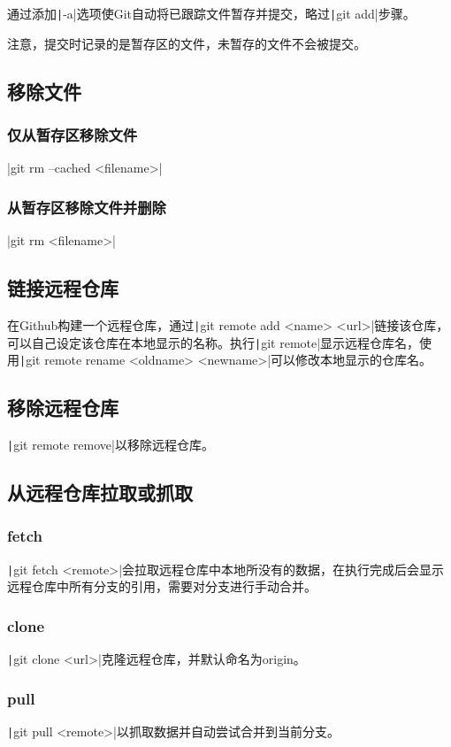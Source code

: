 \documentclass[fontset=ubuntu]{ctexart}
\begin{document}
通过添加\texttt|-a|选项使Git自动将已跟踪文件暂存并提交，略过\texttt|git add|步骤。

注意，提交时记录的是暂存区的文件，未暂存的文件不会被提交。

\subsection{移除文件}
\subsubsection{仅从暂存区移除文件}
|git rm --cached <filename>|

\subsubsection{从暂存区移除文件并删除}
|git rm <filename>|

\subsection{链接远程仓库}
在Github构建一个远程仓库，通过\texttt|git remote add <name> <url>|链接该仓库，可以自己设定该仓库在本地显示的名称。执行\texttt|git remote|显示远程仓库名，使用\texttt|git remote rename <oldname> <newname>|可以修改本地显示的仓库名。

\subsection{移除远程仓库}
\texttt|git remote remove|以移除远程仓库。

\subsection{从远程仓库拉取或抓取}
\subsubsection{fetch}
\texttt|git fetch <remote>|会拉取远程仓库中本地所没有的数据，在执行完成后会显示远程仓库中所有分支的引用，需要对分支进行手动合并。

\subsubsection{clone}
\texttt|git clone <url>|克隆远程仓库，并默认命名为origin。

\subsubsection{pull}
\texttt|git pull <remote>|以抓取数据并自动尝试合并到当前分支。
\end{document}
